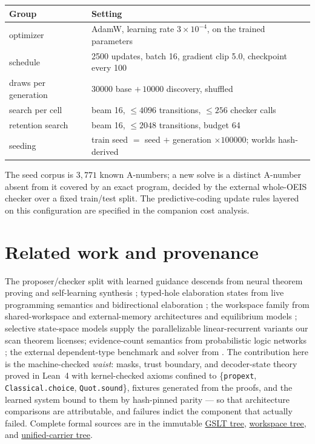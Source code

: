 \documentclass[11pt]{article}
\newcommand{\code}[1]{\texttt{#1}}
\newcommand{\formalcommit}{f3a31db36bb2f944312ee31c1d86c2758109e83a}
\begin{document}
\begin{center}\small
\begin{tabular}{@{}ll@{}}
\toprule
Group & Setting \\
\midrule
optimizer & AdamW, learning rate $3\times10^{-4}$, on the trained parameters \\
schedule & 2500 updates, batch 16, gradient clip 5.0, checkpoint every 100 \\
draws per generation & $30000$ base $+\,10000$ discovery, shuffled \\
search per cell & beam 16, $\le 4096$ transitions, $\le 256$ checker calls \\
retention search & beam 16, $\le 2048$ transitions, budget 64 \\
seeding & train seed $=$ seed $+$ generation $\times 100000$; worlds hash-derived \\
\bottomrule
\end{tabular}
\end{center}

\noindent The seed corpus is $3{,}771$ known A-numbers; a new solve is a distinct A-number
absent from it covered by an exact program, decided by the external whole-OEIS checker over a
fixed train/test split. The predictive-coding update rules layered on this configuration are
specified in the companion cost analysis.

\section{Related work and provenance}
\label{sec:related}

The proposer/checker split with learned guidance descends from neural theorem proving
and self-learning synthesis \cite{gauthier2023}; typed-hole elaboration states from
live programming semantics \cite{omar2017} and bidirectional elaboration
\cite{demoura2015}; the workspace family from shared-workspace and external-memory
architectures \cite{goyal2021} and equilibrium models \cite{bai2019deq}; selective
state-space models \cite{gu2023mamba} supply the parallelizable linear-recurrent
variants our scan theorem licenses; evidence-count semantics from probabilistic logic
networks \cite{pln2009}; the external dependent-type benchmark and solver from
\cite{norman2026}. The contribution here is the machine-checked \emph{waist}: masks,
trust boundary, and decoder-state theory proved in Lean~4 with kernel-checked axioms
confined to \{\code{propext}, \code{Classical.choice}, \code{Quot.sound}\}, fixtures
generated from the proofs, and the learned system bound to them by hash-pinned parity
--- so that architecture comparisons are attributable, and failures indict the
component that actually failed. Complete formal sources are in the immutable
\href{https://github.com/zariuq/MeTTapedia/tree/\formalcommit/lean/mettapedia/Mettapedia/GSLT}{GSLT tree},
\href{https://github.com/zariuq/MeTTapedia/tree/\formalcommit/lean/mettapedia/Mettapedia/MachineLearning/NeuralNetworks/WorkspaceDecoder}{workspace tree}, and
\href{https://github.com/zariuq/MeTTapedia/tree/\formalcommit/lean/mettapedia/Mettapedia/MachineLearning/NeuralNetworks/UnifiedCarrier}{unified-carrier tree}.
\end{document}
